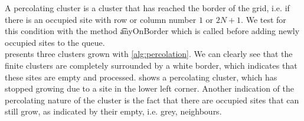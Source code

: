 A percolating cluster is a cluster that has reached the border of the grid, i.e. if there is an occupied site with row or column number $1$ or $2N + 1$. We test for this condition with the method \t{anyOnBorder} which is called before adding newly occupied sites to the queue.\\

 presents three clusters grown with \cref{alg:percolation}. We can clearly see that the finite clusters are completely surrounded by a white border, which indicates that these sites are empty and processed.  shows a percolating cluster, which has stopped growing due to a site in the lower left corner.
Another indication of the percolating nature of the cluster is the fact that there are occupied sites that can still grow, as indicated by their empty, i.e. grey, neighbours.

